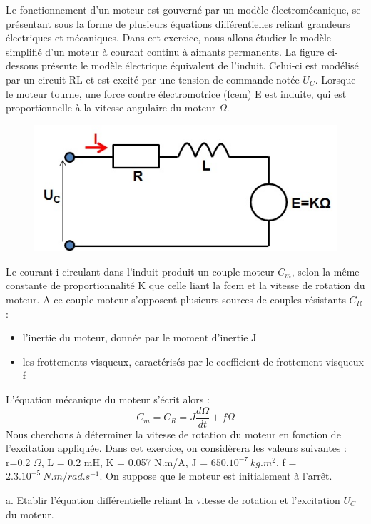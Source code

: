 	Le fonctionnement d'un moteur est gouverné par un modèle électromécanique, se présentant sous la forme de plusieurs équations différentielles reliant grandeurs électriques et mécaniques. Dans cet exercice, nous allons étudier le modèle simplifié d'un moteur à courant continu à aimants permanents. La figure ci-dessous présente le modèle électrique équivalent de l'induit. Celui-ci est modélisé par un circuit RL et est excité par une tension de commande notée $U_{C}$. Lorsque le moteur tourne, une force contre électromotrice (fcem) E est induite, qui est proportionnelle à la vitesse angulaire du moteur $\Omega$. 
	\begin{figure}[h!]
		\centering
		\includegraphics[scale=0.5]{images/Exo3_moteur.jpg} 
	\end{figure}	
	Le courant i circulant dans l'induit produit un couple moteur $C_{m}$, selon la même constante de proportionnalité K que celle liant la fcem et la vitesse de rotation du moteur. A ce couple moteur s'opposent plusieurs sources de couples résistants $C_{R}$ :
	\begin{itemize}
		\item l'inertie du moteur, donnée par le moment d'inertie J
		\item les frottements visqueux, caractérisés par le coefficient de frottement visqueux f
	\end{itemize}
	L'équation mécanique du moteur s'écrit alors :
	\begin{equation*}
	C_{m} = C_{R} = J\frac{d\Omega}{dt}+f\Omega
	\end{equation*}	
	Nous cherchons à déterminer la vitesse de rotation du moteur en fonction de l'excitation appliquée.
	Dans cet exercice, on considèrera les valeurs suivantes : r=0.2 $\Omega$, L = 0.2 mH, K = 0.057 N.m/A, J = $650.10^{-7}~kg.m^{2}$, f = $2.3.10^{-5}~N.m/rad.s^{-1}$. On suppose que le moteur est initialement à l'arrêt.
	
	a. Etablir l'équation différentielle reliant la vitesse de rotation et l'excitation $U_{C}$ du moteur.
	
